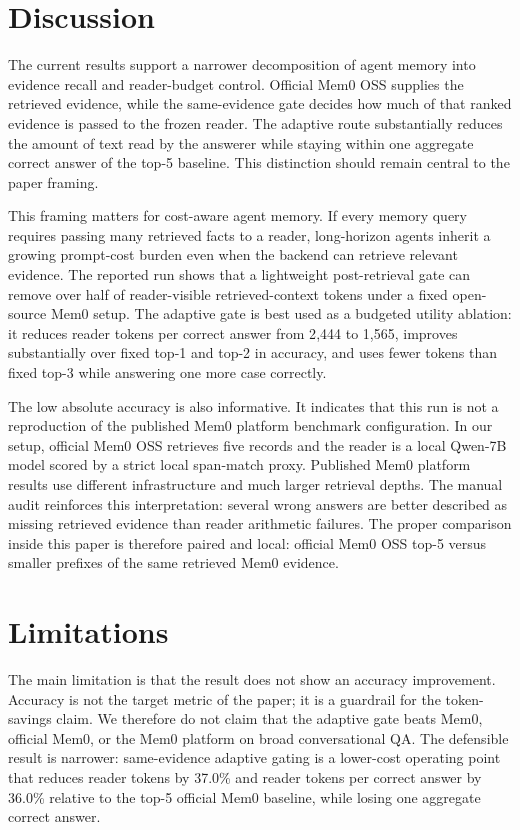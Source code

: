 \documentclass{article}
\begin{document}
\section{Discussion}

The current results support a narrower decomposition of agent memory into evidence recall and reader-budget control. Official Mem0 OSS supplies the retrieved evidence, while the same-evidence gate decides how much of that ranked evidence is passed to the frozen reader. The adaptive route substantially reduces the amount of text read by the answerer while staying within one aggregate correct answer of the top-5 baseline. This distinction should remain central to the paper framing.

This framing matters for cost-aware agent memory. If every memory query requires passing many retrieved facts to a reader, long-horizon agents inherit a growing prompt-cost burden even when the backend can retrieve relevant evidence. The reported run shows that a lightweight post-retrieval gate can remove over half of reader-visible retrieved-context tokens under a fixed open-source Mem0 setup. The adaptive gate is best used as a budgeted utility ablation: it reduces reader tokens per correct answer from 2{,}444 to 1{,}565, improves substantially over fixed top-1 and top-2 in accuracy, and uses fewer tokens than fixed top-3 while answering one more case correctly.

The low absolute accuracy is also informative. It indicates that this run is not a reproduction of the published Mem0 platform benchmark configuration. In our setup, official Mem0 OSS retrieves five records and the reader is a local Qwen-7B model scored by a strict local span-match proxy. Published Mem0 platform results use different infrastructure and much larger retrieval depths. The manual audit reinforces this interpretation: several wrong answers are better described as missing retrieved evidence than reader arithmetic failures. The proper comparison inside this paper is therefore paired and local: official Mem0 OSS top-5 versus smaller prefixes of the same retrieved Mem0 evidence.

\section{Limitations}

The main limitation is that the result does not show an accuracy improvement. Accuracy is not the target metric of the paper; it is a guardrail for the token-savings claim. We therefore do not claim that the adaptive gate beats Mem0, official Mem0, or the Mem0 platform on broad conversational QA. The defensible result is narrower: same-evidence adaptive gating is a lower-cost operating point that reduces reader tokens by 37.0\% and reader tokens per correct answer by 36.0\% relative to the top-5 official Mem0 baseline, while losing one aggregate correct answer.
\end{document}
